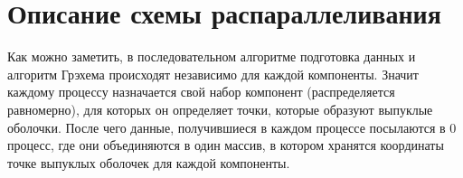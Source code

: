 \documentclass{report}
\begin{document}
\section*{Описание схемы распараллеливания}
\par Как можно заметить, в последовательном алгоритме подготовка данных и алгоритм Грэхема происходят независимо для каждой компоненты. Значит каждому процессу назначается свой набор компонент (распределяется равномерно), для которых он определяет точки, которые образуют выпуклые оболочки. После чего данные, получившиеся в каждом процессе посылаются в 0 процесс, где они объединяются в один массив, в котором хранятся координаты точке выпуклых оболочек для каждой компоненты.
\newpage

\end{document}
